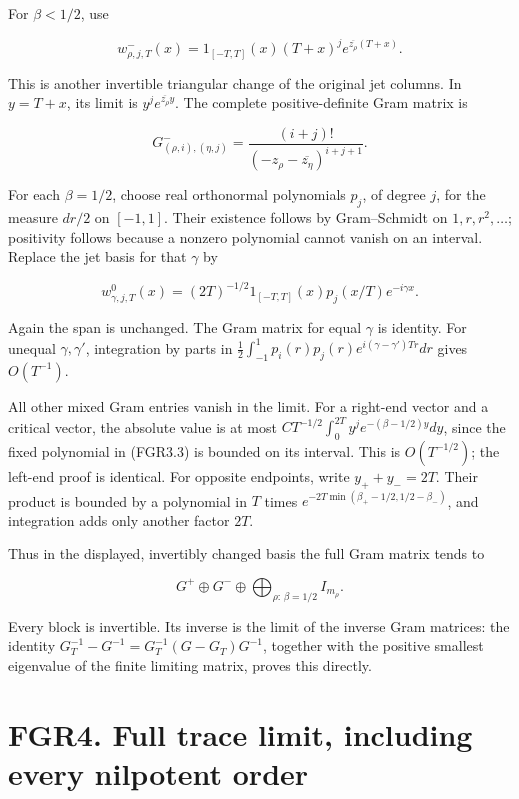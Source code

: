 For \(\beta<1/2\), use

\[
 w^-_{\rho,j,T}(x)=1_{[-T,T]}(x)(T+x)^j
                              e^{\overline{z_\rho}(T+x)}.
\tag{FGR3.1}
\]

This is another invertible triangular change of the original jet
columns. In \(y=T+x\), its limit is \(y^je^{\overline{z_\rho}y}\). The
complete positive-definite Gram matrix is

\[
 G^-_{(\rho,i),(\eta,j)}
 =\frac{(i+j)!}{(-z_\rho-\overline{z_\eta})^{i+j+1}}.
\tag{FGR3.2}
\]

For each \(\beta=1/2\), choose real orthonormal polynomials \(p_j\), of
degree \(j\), for the measure \(dr/2\) on \([-1,1]\). Their existence
follows by Gram--Schmidt on \(1,r,r^2,\ldots\); positivity follows
because a nonzero polynomial cannot vanish on an interval. Replace the
jet basis for that \(\gamma\) by

\[
 w^0_{\gamma,j,T}(x)=(2T)^{-1/2}1_{[-T,T]}(x)
                                  p_j(x/T)e^{-i\gamma x}.
\tag{FGR3.3}
\]

Again the span is unchanged. The Gram matrix for equal \(\gamma\) is
identity. For unequal \(\gamma,\gamma'\), integration by parts in
\(\tfrac12\int_{-1}^1p_i(r)p_j(r)e^{i(\gamma-\gamma')Tr}dr\) gives
\(O(T^{-1})\).

All other mixed Gram entries vanish in the limit. For a right-end vector
and a critical vector, the absolute value is at most
\(C T^{-1/2}\int_0^{2T}y^j e^{-(\beta-1/2)y}dy\), since the fixed
polynomial in (FGR3.3) is bounded on its interval. This is
\(O(T^{-1/2})\); the left-end proof is identical. For opposite
endpoints, write \(y_++y_-=2T\). Their product is bounded by a
polynomial in \(T\) times \(e^{-2T\min(\beta_+-1/2,1/2-\beta_-)}\), and
integration adds only another factor \(2T\).

Thus in the displayed, invertibly changed basis the full Gram matrix
tends to

\[
 G^+\oplus G^-\oplus\bigoplus_{\rho:\,\beta=1/2} I_{m_\rho}.
\tag{FGR3.4}
\]

Every block is invertible. Its inverse is the limit of the inverse Gram
matrices: the identity \(G_T^{-1}-G^{-1}=G_T^{-1}(G-G_T)G^{-1}\),
together with the positive smallest eigenvalue of the finite limiting
matrix, proves this directly.

\section{FGR4. Full trace limit, including every nilpotent
order}\label{fgr4.-full-trace-limit-including-every-nilpotent-order}

